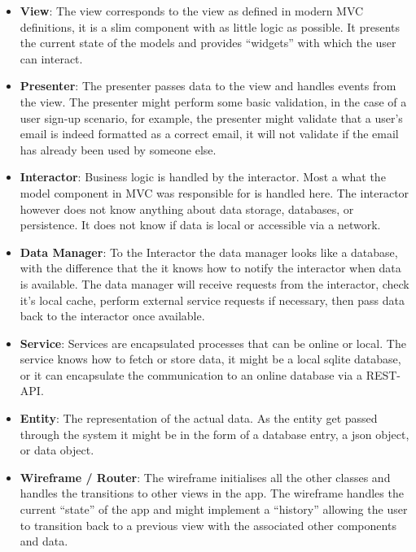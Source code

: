 \begin{itemize}[label={}]

\item \textbf{View}: The view corresponds to the view as defined in modern MVC definitions, it is a slim component with as little logic as possible. It presents the current state of the models and provides “widgets” with which the user can interact.
\item \textbf{Presenter}: The presenter passes data to the view and handles events from the view. The presenter might perform some basic validation, in the case of a user sign-up scenario, for example, the presenter might validate that a user’s email is indeed formatted as a correct email, it will not validate if the email has already been used by someone else.

\item \textbf{Interactor}: Business logic is handled by the interactor. Most a what the model component in MVC was responsible for is handled here. The interactor however does not know anything about data storage, databases, or persistence. It does not know if data is local or accessible via a network.

\item \textbf{Data Manager}: To the Interactor the data manager looks like a database, with the difference that the it knows how to notify the interactor when data is available. The data manager will receive requests from the interactor, check it’s local cache, perform external service requests if necessary, then pass data back to the interactor once available.
\item \textbf{Service}: Services are encapsulated processes that can be online or local. The service knows how to fetch or store data, it might be a local sqlite database, or it can encapsulate the communication to an online database via a REST-API.

\item \textbf{Entity}: The representation of the actual data. As the entity get passed through the system it might be in the form of a database entry, a json object, or data object.

\item \textbf{Wireframe / Router}: The wireframe initialises all the other classes and handles the transitions to other views in the app. The wireframe handles the current “state” of the app and might implement a “history” allowing the user to transition back to a previous view with the associated other components and data.


\end{itemize}